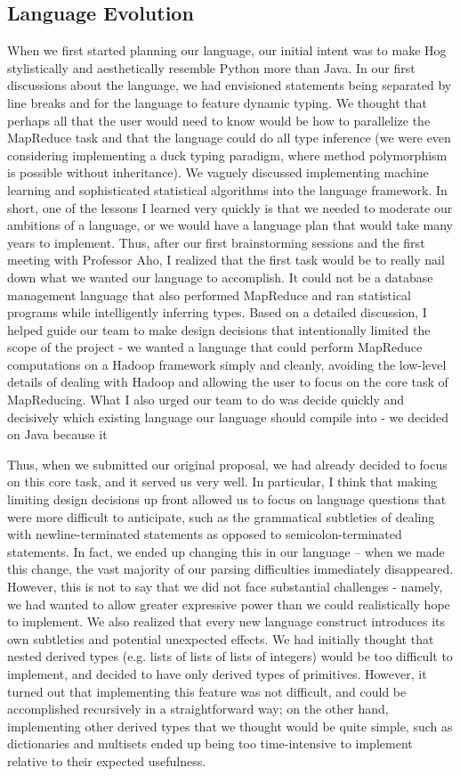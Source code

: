 \documentclass{report}
\begin{document}
\subsection{Language Evolution}
When we first started planning our language, our initial intent was to make Hog stylistically and aesthetically resemble Python more than Java. In our first discussions about the language, we had envisioned statements being separated by line breaks and for the language to feature dynamic typing. We thought that perhaps all that the user would need to know would be how to parallelize the MapReduce task and that the language could do all type inference (we were even considering implementing a duck typing paradigm, where method polymorphism is possible without inheritance). We vaguely discussed implementing machine learning and sophisticated statistical algorithms into the language framework. In short, one of the lessons I learned very quickly is that we needed to moderate our ambitions of a language, or we would have a language plan that would take many years to implement. Thus, after our first brainstorming sessions and the first meeting with Professor Aho, I realized that the first task would be to really nail down what we wanted our language to accomplish. It could not be a database management language that also performed MapReduce and ran statistical programs while intelligently inferring types. Based on a detailed discussion, I helped guide our team to make design decisions that intentionally limited the scope of the project - we wanted a language that could perform MapReduce computations on a Hadoop framework simply and cleanly, avoiding the low-level details of dealing with Hadoop and allowing the user to focus on the core task of MapReducing. What I also urged our team to do was decide quickly and decisively which existing language our language should compile into - we decided on Java because it 

Thus, when we submitted our original proposal, we had already decided to focus on this core task, and it served us very well. In particular, I think that making limiting design decisions up front allowed us to focus on language questions that were more difficult to anticipate, such as the grammatical subtleties of dealing with newline-terminated statements as opposed to semicolon-terminated statements. In fact, we ended up changing this in our language -- when we made this change, the vast majority of our parsing difficulties immediately disappeared. However, this is not to say that we did not face substantial challenges - namely, we had wanted to allow greater expressive power than we could realistically hope to implement. We also realized that every new language construct introduces its own subtleties and potential unexpected effects. We had initially thought that nested derived types (e.g. lists of lists of lists of integers) would be too difficult to implement, and decided to have only derived types of primitives. However, it turned out that implementing this feature was not difficult, and could be accomplished recursively in a straightforward way; on the other hand, implementing other derived types that we thought would be quite simple, such as dictionaries and multisets ended up being too time-intensive to implement relative to their expected usefulness.
\end{document}
